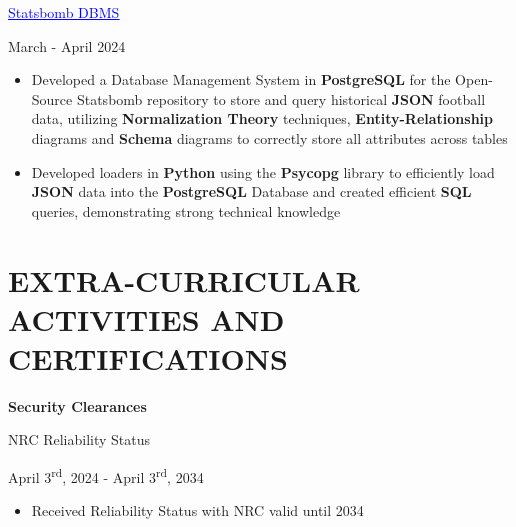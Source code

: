 \documentclass[a4paper,11pt]{article}
\begin{document}
\begin{minipage}{.65\linewidth}
\href{https://github.com/JeremyFriesenGitHub/Statsbomb_DBMS}{\textcolor{blue}{\uline{Statsbomb DBMS}}}                
\end{minipage}
\hfill
\begin{minipage}{.34\linewidth}
    \flushright
    March - April 2024
\end{minipage}
\begin{minipage}{\linewidth}
\vspace{10pt}
\begin{itemize}
    \item Developed a Database Management System in \textbf{PostgreSQL} for the Open-Source Statsbomb repository to store and query historical \textbf{JSON} football data, utilizing \textbf{Normalization Theory} techniques, \textbf{Entity-Relationship} diagrams and \textbf{Schema} diagrams to correctly store all attributes across tables
    \item Developed loaders in \textbf{Python} using the \textbf{Psycopg} library to efficiently load \textbf{JSON} data into the \textbf{PostgreSQL} Database and created efficient \textbf{SQL} queries, demonstrating strong technical knowledge
  \end{itemize}
\end{minipage}


\vspace{2pt}
\section{EXTRA-CURRICULAR ACTIVITIES AND CERTIFICATIONS}

\begin{minipage}{.65\linewidth}
   \textbf{Security Clearances} 
\end{minipage}

\begin{minipage}[t]{.65\linewidth}
    NRC Reliability Status
\end{minipage}%
\begin{minipage}[t]{.34\linewidth}
    \flushright
    April 3\textsuperscript{rd}, 2024 - April 3\textsuperscript{rd}, 2034
\end{minipage}

\begin{minipage}{\linewidth}
\vspace{10pt}
\begin{itemize}
    \item Received Reliability Status with NRC valid until 2034
\end{itemize}
\vspace{1pt}
\end{minipage}
\end{document}
